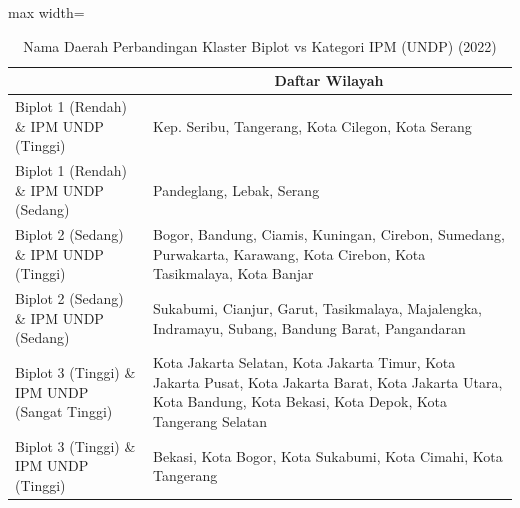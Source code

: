 \begin{table}[H]
\centering
\caption{Nama Daerah Perbandingan Klaster Biplot vs Kategori IPM (UNDP) (2022)} \label{tab:app1crossname2022}
\begin{adjustbox}{max width=\textwidth}
\begin{tabular}{|>{\centering\arraybackslash}p{4cm}|p{10cm}|}
\hline
\multicolumn{1}{|c|}{\textbf{Kategori}} & \multicolumn{1}{c|}{\textbf{Daftar Wilayah}} \\
\hline
Biplot 1 (Rendah) \& IPM UNDP (Tinggi) & Kep. Seribu, Tangerang, Kota Cilegon, Kota Serang \\
\hline
Biplot 1 (Rendah) \& IPM UNDP (Sedang) & Pandeglang, Lebak, Serang \\
\hline
Biplot 2 (Sedang) \& IPM UNDP (Tinggi) & Bogor, Bandung, Ciamis, Kuningan, Cirebon, Sumedang, Purwakarta, Karawang, Kota Cirebon, Kota Tasikmalaya, Kota Banjar \\
\hline
Biplot 2 (Sedang) \& IPM UNDP (Sedang) & Sukabumi, Cianjur, Garut, Tasikmalaya, Majalengka, Indramayu, Subang, Bandung Barat, Pangandaran \\
\hline
Biplot 3 (Tinggi) \& IPM UNDP (Sangat Tinggi) & Kota Jakarta Selatan, Kota Jakarta Timur, Kota Jakarta Pusat, Kota Jakarta Barat, Kota Jakarta Utara, Kota Bandung, Kota Bekasi, Kota Depok, Kota Tangerang Selatan \\
\hline
Biplot 3 (Tinggi) \& IPM UNDP (Tinggi) & Bekasi, Kota Bogor, Kota Sukabumi, Kota Cimahi, Kota Tangerang \\
\hline
\end{tabular}
\end{adjustbox}
\end{table}